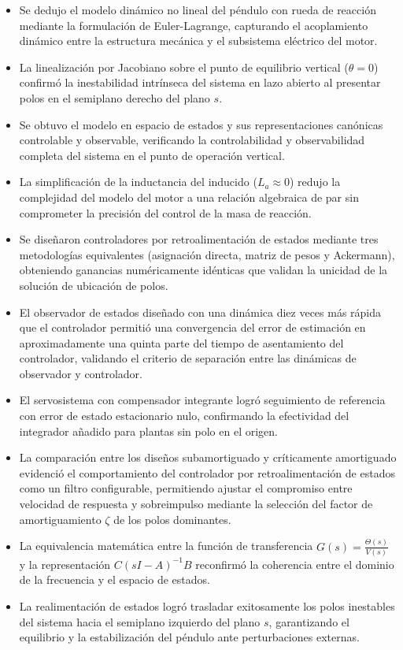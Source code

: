 \documentclass[conference]{IEEEtran}
\begin{document}
\begin{enumerate}
   \begin{itemize}
    \item Se dedujo el modelo dinámico no lineal del péndulo con rueda de reacción mediante la formulación de Euler-Lagrange, capturando el acoplamiento dinámico entre la estructura mecánica y el subsistema eléctrico del motor.
    \item La linealización por Jacobiano sobre el punto de equilibrio vertical ($\theta = 0$) confirmó la inestabilidad intrínseca del sistema en lazo abierto al presentar polos en el semiplano derecho del plano $s$.
    \item Se obtuvo el modelo en espacio de estados y sus representaciones canónicas controlable y observable, verificando la controlabilidad y observabilidad completa del sistema en el punto de operación vertical.
    \item La simplificación de la inductancia del inducido ($L_a \approx 0$) redujo la complejidad del modelo del motor a una relación algebraica de par sin comprometer la precisión del control de la masa de reacción.
    \item Se diseñaron controladores por retroalimentación de estados mediante tres metodologías equivalentes (asignación directa, matriz de pesos y Ackermann), obteniendo ganancias numéricamente idénticas que validan la unicidad de la solución de ubicación de polos.
    \item El observador de estados diseñado con una dinámica diez veces más rápida que el controlador permitió una convergencia del error de estimación en aproximadamente una quinta parte del tiempo de asentamiento del controlador, validando el criterio de separación entre las dinámicas de observador y controlador.
    \item El servosistema con compensador integrante logró seguimiento de referencia con error de estado estacionario nulo, confirmando la efectividad del integrador añadido para plantas sin polo en el origen.
    \item La comparación entre los diseños subamortiguado y críticamente amortiguado evidenció el comportamiento del controlador por retroalimentación de estados como un filtro configurable, permitiendo ajustar el compromiso entre velocidad de respuesta y sobreimpulso mediante la selección del factor de amortiguamiento $\zeta$ de los polos dominantes.
    \item La equivalencia matemática entre la función de transferencia $G(s) = \frac{\Theta(s)}{V(s)}$ y la representación $C(sI-A)^{-1}B$ reconfirmó la coherencia entre el dominio de la frecuencia y el espacio de estados.
    \item La realimentación de estados logró trasladar exitosamente los polos inestables del sistema hacia el semiplano izquierdo del plano $s$, garantizando el equilibrio y la estabilización del péndulo ante perturbaciones externas.
\end{itemize}
\end{enumerate}
\end{document}
